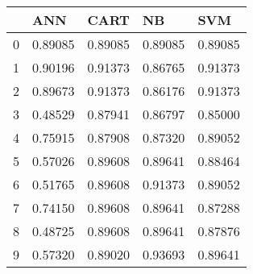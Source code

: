 \begin{tabular}{|l|l|l|l|l|}
\toprule
{} &      ANN &     CART &       NB &      SVM \\
\midrule
0 &  0.89085 &  0.89085 &  0.89085 &  0.89085 \\
1 &  0.90196 &  0.91373 &  0.86765 &  0.91373 \\
2 &  0.89673 &  0.91373 &  0.86176 &  0.91373 \\
3 &  0.48529 &  0.87941 &  0.86797 &  0.85000 \\
4 &  0.75915 &  0.87908 &  0.87320 &  0.89052 \\
5 &  0.57026 &  0.89608 &  0.89641 &  0.88464 \\
6 &  0.51765 &  0.89608 &  0.91373 &  0.89052 \\
7 &  0.74150 &  0.89608 &  0.89641 &  0.87288 \\
8 &  0.48725 &  0.89608 &  0.89641 &  0.87876 \\
9 &  0.57320 &  0.89020 &  0.93693 &  0.89641 \\
\bottomrule
\end{tabular}
